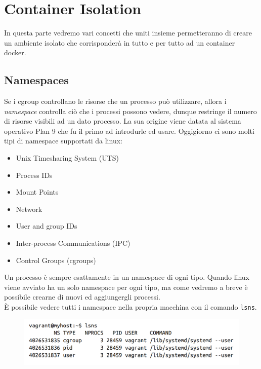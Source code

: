\chapter{Container Isolation}

In questa parte vedremo vari concetti che uniti insieme permetteranno di creare
un ambiente isolato che corrisponderà in tutto e per tutto ad un container docker.

\section{Namespaces}

Se i cgroup controllano le risorse che un processo può utilizzare, allora i
\textit{namespace} controlla ciò che i processi possono vedere, dunque restringe
il numero di risorse visibili ad un dato processo.
La sua origine viene datata al sistema operativo Plan 9 che fu il primo ad
introdurle ed usare.
Oggigiorno ci sono molti tipi di namespace supportati da linux:

\begin{itemize}
    \item Unix Timesharing System (UTS)
    \item Process IDs
    \item Mount Points
    \item Network
    \item User and group IDs
    \item Inter-process Communications (IPC)
    \item Control Groups (cgroups)
\end{itemize}

Un processo è sempre esattamente in un namespace di ogni tipo.
Quando linux viene avviato ha un solo namespace per ogni tipo, ma come vedremo
a breve è possibile crearne di nuovi ed aggiungergli processi.\\

È possibile vedere tutti i namespace nella propria macchina con il comando
\verb|lsns|.

\begin{figure}[H]
    \centering
    \includegraphics[width=\textwidth, keepaspectratio]{capitoli/os_security/imgs/namespace1.png}
\end{figure}

